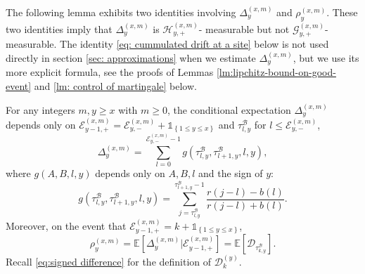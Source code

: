 \documentclass[EJP]{ejpecp} %
\begin{document}
The following lemma exhibits two identities involving $\Delta^{(x,m)}_{y}$ and $\rho_{y}^{(x,m)}$. These two identities imply that $\Delta^{(x,m)}_{y}$ is $\mathcal{H}_{y, +}^{(x,m)}$- measurable but not $\mathcal{G}_{y, +}^{(x,m)}$- measurable. The identity \eqref{eq: cummulated drift at a site} below is not used directly in section \ref{sec: approximations} when we estimate $\Delta^{(x,m)}_{y}$, but we use its more explicit formula, see the proofs of Lemmas \ref{lm:lipchitz-bound-on-good-event} and \ref{lm: control of martingale} below.
\begin{lemma}\label{lm: identities for Del, rho} 
	For any integers $m,y\geq x$ with $m\geq 0$, the conditional expectation $\Delta^{(x,m)}_{y}$ depends only on $ \mathcal{E}_{y-1,+}^{(x,m)} = \mathcal{E}_{y,-}^{(x,m)} + \mathbb{1}_{ \left\{ 1\leq y \leq x \right\} }$ and $ \tau^{\mathscr{B}}_{l,y}$ for $l\leq \mathcal{E}^{(x,m)}_{y,-} $,
	\begin{equation} \label{eq: cummulated drift at a site}
		\Delta_{y}^{(x,m)} = \sum_{l=0 }^{ \mathcal{E}^{(x,m)}_{y,-} -1  } g\left(\tau^{\mathscr{B}}_{l,y},\tau^{\mathscr{B}}_{l+1,y},l,y \right),
	\end{equation}	
	where $g(A,B,l,y)$ depends only on $A,B,l$ and the sign of $y$:
	\begin{equation}
		g\left(\tau^{\mathscr{B}}_{l,y},\tau^{\mathscr{B}}_{l+1,y},l,y\right)
		= \sum_{j=\tau^{\mathscr{B}}_{l,y}}^{\tau^{\mathscr{B}}_{l+1,y}-1} \frac{ r( j-l) - b(l)  }{ r( j-l) + b(l)  }.
	\end{equation}
	Moreover, on the event that $\mathcal{E}^{(x,m)}_{y-1,+}  = k + \mathbb{1}_{\left\{1\leq y\leq x\right\}}$,
	\begin{equation} \label{eq: conditional mean in GPU represenetation}
		\rho_{y}^{(x,m)} = \mathbb{E}\left[ \Delta_{y}^{(x,m)}\vert \mathcal{E}^{(x,m)}_{y-1,+} \right]	  
		= \mathbb{E}\left[  \mathscr{D}_{\tau^{\mathscr{B}}_{k,y}} \right].
	\end{equation}
	Recall \eqref{eq:signed difference} for the definition of $\mathscr{D}^{(y)}_k$.	
\end{lemma}
\end{document}
